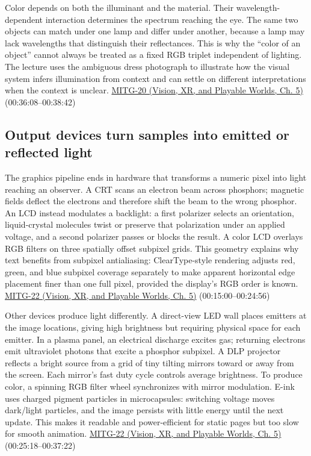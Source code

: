 Color depends on both the illuminant and the material. Their wavelength-dependent interaction determines the spectrum reaching the eye. The same two objects can match under one lamp and differ under another, because a lamp may lack wavelengths that distinguish their reflectances. This is why the ``color of an object'' cannot always be treated as a fixed RGB triplet independent of lighting. The lecture uses the ambiguous dress photograph to illustrate how the visual system infers illumination from context and can settle on different interpretations when the context is unclear. \href{../07-Vision-XR-and-Playable-Worlds/main.pdf\#nameddest=04-visual-computing-ii-ch036-mitg-20---color}{MITG-20 (Vision, XR, and Playable Worlds, Ch. 5)} (00:36:08--00:38:42)

\subsection{Output devices turn samples into emitted or reflected light}\label{03-visual-computing-i-ch004-output-devices-turn-samples-into-emitted-or-reflected-light}

\hypertarget{03-visual-computing-i-ch004-output-devices-turn-samples-into-emitted-or-reflected-light}{}

The graphics pipeline ends in hardware that transforms a numeric pixel into light reaching an observer. A CRT scans an electron beam across phosphors; magnetic fields deflect the electrons and therefore shift the beam to the wrong phosphor. An LCD instead modulates a backlight: a first polarizer selects an orientation, liquid-crystal molecules twist or preserve that polarization under an applied voltage, and a second polarizer passes or blocks the result. A color LCD overlays RGB filters on three spatially offset subpixel grids. This geometry explains why text benefits from subpixel antialiasing: ClearType-style rendering adjusts red, green, and blue subpixel coverage separately to make apparent horizontal edge placement finer than one full pixel, provided the display's RGB order is known. \href{../07-Vision-XR-and-Playable-Worlds/main.pdf\#nameddest=04-visual-computing-ii-ch036-mitg-22---output-devices}{MITG-22 (Vision, XR, and Playable Worlds, Ch. 5)} (00:15:00--00:24:56)

Other devices produce light differently. A direct-view LED wall places emitters at the image locations, giving high brightness but requiring physical space for each emitter. In a plasma panel, an electrical discharge excites gas; returning electrons emit ultraviolet photons that excite a phosphor subpixel. A DLP projector reflects a bright source from a grid of tiny tilting mirrors toward or away from the screen. Each mirror's fast duty cycle controls average brightness. To produce color, a spinning RGB filter wheel synchronizes with mirror modulation. E-ink uses charged pigment particles in microcapsules: switching voltage moves dark/light particles, and the image persists with little energy until the next update. This makes it readable and power-efficient for static pages but too slow for smooth animation. \href{../07-Vision-XR-and-Playable-Worlds/main.pdf\#nameddest=04-visual-computing-ii-ch036-mitg-22---output-devices}{MITG-22 (Vision, XR, and Playable Worlds, Ch. 5)} (00:25:18--00:37:22)

